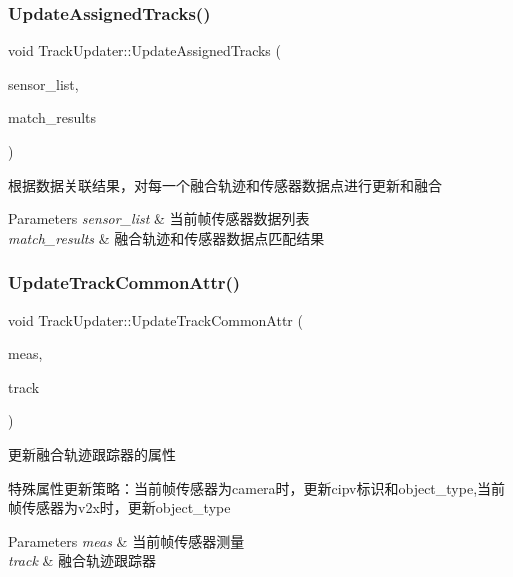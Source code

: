 \subsubsection{\texorpdfstring{Update\+Assigned\+Tracks()}{UpdateAssignedTracks()}}
{\footnotesize\ttfamily void Track\+Updater\+::\+Update\+Assigned\+Tracks (\begin{DoxyParamCaption}\item[{const Sensor\+Frame \&}]{sensor\+\_\+list,  }\item[{const std\+::vector$<$ Track\+Match\+Pair $>$ \&}]{match\+\_\+results }\end{DoxyParamCaption})}



根据数据关联结果，对每一个融合轨迹和传感器数据点进行更新和融合 


\begin{DoxyParams}{Parameters}
{\em sensor\+\_\+list} & 当前帧传感器数据列表 \\
\hline
{\em match\+\_\+results} & 融合轨迹和传感器数据点匹配结果 \\
\hline
\end{DoxyParams}
\mbox{\label{classTrackUpdater_ae14cb6ffde06a9b60722aac04ccf2b56}} 
\subsubsection{\texorpdfstring{Update\+Track\+Common\+Attr()}{UpdateTrackCommonAttr()}}
{\footnotesize\ttfamily void Track\+Updater\+::\+Update\+Track\+Common\+Attr (\begin{DoxyParamCaption}\item[{const Sensor\+Object \&}]{meas,  }\item[{Fusion\+Track \&}]{track }\end{DoxyParamCaption})\hspace{0.3cm}{\ttfamily [private]}}



更新融合轨迹跟踪器的属性 

特殊属性更新策略：当前帧传感器为camera时，更新cipv标识和object\+\_\+type,当前帧传感器为v2x时，更新object\+\_\+type 
\begin{DoxyParams}{Parameters}
{\em meas} & 当前帧传感器测量 \\
\hline
{\em track} & 融合轨迹跟踪器 \\
\hline
\end{DoxyParams}
\mbox{\label{classTrackUpdater_a1113a816e4e495cd93f86d20183689c9}} 
